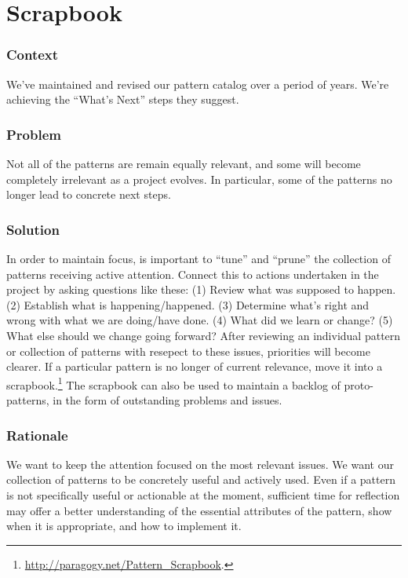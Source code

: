 \begingroup \color{BurntOrange}

\section{Scrapbook} \label{sec:Scrapbook}

\subsubsection*{Context} We've maintained and revised our pattern catalog over a period of years.  We're achieving
the ``What's Next'' steps they suggest.

\subsubsection*{Problem} Not all of the patterns are remain equally relevant, and some will become completely irrelevant as a project evolves.  In particular, some of the patterns no longer lead to concrete next steps.

\subsubsection*{Solution} In order to maintain focus, is important to ``tune'' and ``prune'' the collection of patterns receiving active attention.  Connect this to actions undertaken in the project by asking questions like these:
(1) Review what was supposed to happen.
(2) Establish what is happening/happened.
(3) Determine what’s right and wrong with what we are doing/have done.
(4) What did we learn or change? 
(5) What else should we change going forward?  \cite[Chapter 28]{peeragogy-handbook}
%
After reviewing an individual pattern or collection of patterns with
resepect to these issues, priorities will become clearer.  If a
particular pattern is no longer of current relevance, move it into a
scrapbook.\footnote{\url{http://paragogy.net/Pattern_Scrapbook}.}  The
scrapbook can also be used to maintain a backlog of proto-patterns, in
the form of outstanding problems and issues.

\subsubsection*{Rationale} We want to keep the attention focused on the most relevant issues.
We want our collection of patterns to be concretely useful and actively used.
Even if a pattern is not specifically useful or actionable at the
moment, sufficient time for reflection may offer a better
understanding of the essential attributes of the pattern, show when it
is appropriate, and how to implement it.

